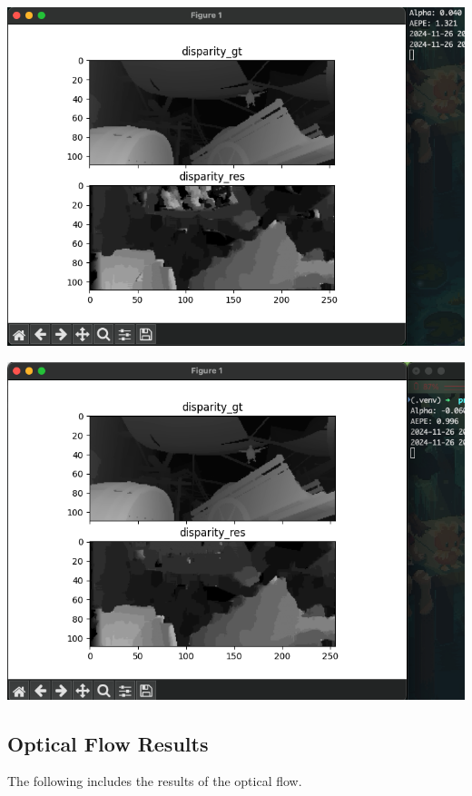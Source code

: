 \documentclass[12pt]{article}
\begin{document}
\begin{minipage}{0.49\textwidth}
    \centering
    \includegraphics[width=\textwidth]{./problem1_stereo/alpha_0.04.png}
\end{minipage}
\begin{minipage}{0.49\textwidth}
    \centering
    \includegraphics[width=\textwidth]{./problem1_stereo/alpha_neg_0.06.png}
\end{minipage}

\subsection*{Optical Flow Results} The following includes the results of the optical flow. \\ 
\end{document}
